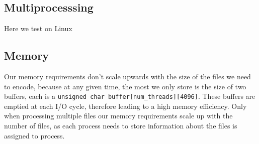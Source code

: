 \subsection{Multiprocesssing}
Here we test on Linux
\subsection{Memory}
Our memory requirements don't scale upwards with the size of the files we need to encode, because at any given time, the most we only store is the size of two buffers, each is a \verb|unsigned char buffer[num_threads][4096]|. These buffers are emptied at each I/O cycle, therefore leading to a high memory efficiency. Only when processing multiple files our memory requirements scale up with the number of files, as each process needs to store information about the files is assigned to process.